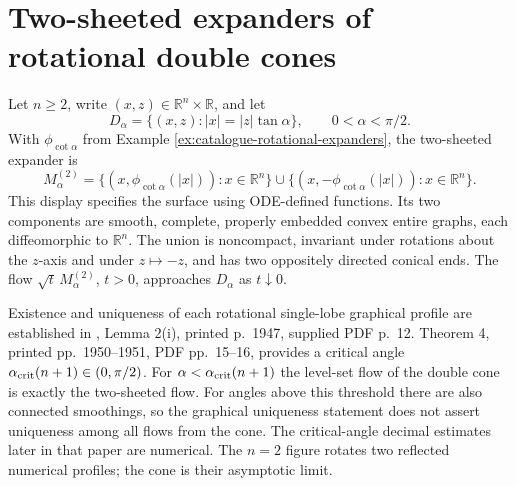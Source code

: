 \chapter{Two-sheeted expanders of rotational double cones}\label{sec:catalogue-two-sheet-expanders}
\begin{example}\label{ex:catalogue-two-sheet-expanders}
Let $n\geq2$, write $(x,z)\in\mathbb R^n\times\mathbb R$, and let
\[
 D_\alpha=\{(x,z):|x|=|z|\tan\alpha\},\qquad 0<\alpha<\pi/2.
\]
With $\phi_{\cot\alpha}$ from Example \ref{ex:catalogue-rotational-expanders}, the two-sheeted expander is
\[
 M_\alpha^{(2)}
 =\{(x,\phi_{\cot\alpha}(|x|)):x\in\mathbb R^n\}
 \mathbin{\cup}
 \{(x,-\phi_{\cot\alpha}(|x|)):x\in\mathbb R^n\}.
\]
This display specifies the surface using ODE-defined functions. Its two components are smooth, complete, properly embedded convex entire graphs, each diffeomorphic to $\mathbb R^n$. The union is noncompact, invariant under rotations about the $z$-axis and under $z\mapsto-z$, and has two oppositely directed conical ends. The flow $\sqrt t\,M_\alpha^{(2)}$, $t>0$, approaches $D_\alpha$ as $t\downarrow0$.

Existence and uniqueness of each rotational single-lobe graphical profile are established in \cite{CatAIC95}, Lemma 2(i), printed p.~1947, supplied PDF p.~12. Theorem 4, printed pp.~1950--1951, PDF pp.~15--16, provides a critical angle $\alpha_{\rm crit}(n+1)\in(0,\pi/2)$. For $\alpha<\alpha_{\rm crit}(n+1)$ the level-set flow of the double cone is exactly the two-sheeted flow. For angles above this threshold there are also connected smoothings, so the graphical uniqueness statement does not assert uniqueness among all flows from the cone. The critical-angle decimal estimates later in that paper are numerical. The $n=2$ figure rotates two reflected numerical profiles; the cone is their asymptotic limit.
\end{example}

